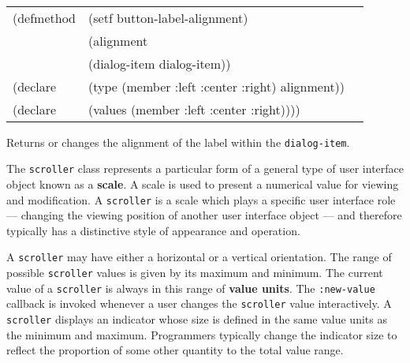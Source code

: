 \begin{flushright} \parbox[t]{6.125in}{
\tt
\begin{tabular}{lll}
\raggedright
(defmethod & (setf button-label-alignment) & \\
         & (alignment \\
         & (dialog-item  dialog-item)) \\
(declare &(type (member :left :center :right)  alignment))\\
(declare & (values (member :left :center :right))))
\end{tabular}
\rm}
\end{flushright}

\begin{flushright} \parbox[t]{6.125in}{
Returns or changes the alignment of the label within the {\tt dialog-item}.}
\end{flushright}




\vfill\pagebreak





The {\tt scroller} class represents a particular form of a general type of user
interface object known as a {\bf scale}.  A scale is used to
present a numerical value for viewing and modification.  A {\tt scroller} is a
scale which plays a specific user interface role --- changing the viewing
position of another user interface object --- and therefore typically has a
distinctive style of appearance and operation.

A {\tt scroller} may have either a horizontal or a vertical orientation.  The
range of possible {\tt scroller} values is given by its maximum and minimum.
The current value of a {\tt scroller} is always in this range of {\bf value
units}.  The {\tt :new-value} callback is invoked
whenever a user changes the {\tt scroller} value interactively.  A {\tt
scroller} displays an indicator whose size is defined in the same value units
as the minimum and maximum.  Programmers typically change the indicator size to
reflect the proportion of some other quantity to the total value range.




